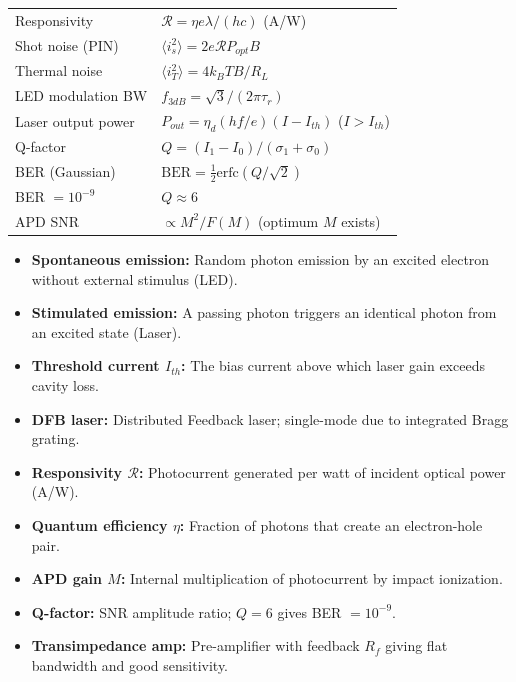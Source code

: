\documentclass[12pt,a4paper]{article}
\renewcommand{\arraystretch}{1.45}
\begin{document}
\begin{tcolorbox}[formulabox, title={\textbf{Key Formulas at a Glance}}]
\renewcommand{\arraystretch}{1.35}
\begin{tabularx}{\linewidth}{B{5.0cm} X}
Responsivity & $\mathcal{R} = \eta e \lambda / (hc)$ \quad (A/W) \\[4pt]
Shot noise (PIN) & $\langle i_s^2 \rangle = 2e\mathcal{R}P_{opt}B$ \\[4pt]
Thermal noise & $\langle i_T^2 \rangle = 4k_BTB/R_L$ \\[4pt]
LED modulation BW & $f_{3dB} = \sqrt{3}/(2\pi\tau_r)$ \\[4pt]
Laser output power & $P_{out} = \eta_d(hf/e)(I - I_{th})$ \quad ($I > I_{th}$) \\[4pt]
Q-factor & $Q = (I_1 - I_0)/(\sigma_1 + \sigma_0)$ \\[4pt]
BER (Gaussian) & $\text{BER} = \frac{1}{2}\text{erfc}(Q/\sqrt{2})$ \\[4pt]
BER $= 10^{-9}$ & $Q \approx 6$ \\[4pt]
APD SNR & $\propto M^2 / F(M)$ \quad (optimum $M$ exists) \\[4pt]
\end{tabularx}
\end{tcolorbox}

\begin{tcolorbox}[defbox, title={\textbf{One-Line Definitions}}]
\begin{itemize}[leftmargin=*, itemsep=2pt, topsep=0pt]
  \item \textbf{Spontaneous emission:} Random photon emission by an excited electron without external stimulus (LED).
  \item \textbf{Stimulated emission:} A passing photon triggers an identical photon from an excited state (Laser).
  \item \textbf{Threshold current $I_{th}$:} The bias current above which laser gain exceeds cavity loss.
  \item \textbf{DFB laser:} Distributed Feedback laser; single-mode due to integrated Bragg grating.
  \item \textbf{Responsivity $\mathcal{R}$:} Photocurrent generated per watt of incident optical power (A/W).
  \item \textbf{Quantum efficiency $\eta$:} Fraction of photons that create an electron-hole pair.
  \item \textbf{APD gain $M$:} Internal multiplication of photocurrent by impact ionization.
  \item \textbf{Q-factor:} SNR amplitude ratio; $Q = 6$ gives BER $= 10^{-9}$.
  \item \textbf{Transimpedance amp:} Pre-amplifier with feedback $R_f$ giving flat bandwidth and good sensitivity.
\end{itemize}
\end{tcolorbox}
\end{document}
